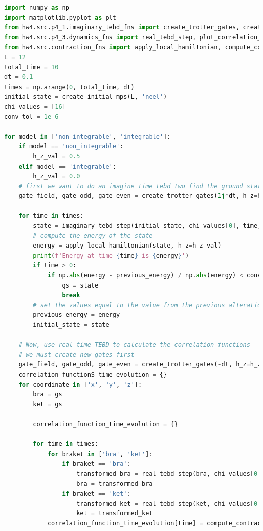 \documentclass[12pt]{article}
\begin{document}
\begin{lstlisting}[language=Python]
import numpy as np
import matplotlib.pyplot as plt
from hw4.src.p4_1.imaginary_tebd_fns import create_trotter_gates, create_initial_mps, imaginary_tebd_step
from hw4.src.p4_3.dynamics_fns import real_tebd_step, plot_correlation_functions
from hw4.src.contraction_fns import apply_local_hamiltonian, compute_contraction
L = 12
total_time = 10
dt = 0.1
times = np.arange(0, total_time, dt)
initial_state = create_initial_mps(L, 'neel')
chi_values = [16]
conv_tol = 1e-6

for model in ['non_integrable', 'integrable']:
    if model == 'non_integrable':
        h_z_val = 0.5
    elif model == 'integrable':
        h_z_val = 0.0
    # first we want to do an imagine time tebd two find the ground state
    gate_field, gate_odd, gate_even = create_trotter_gates(1j*dt, h_z=h_z_val)
    
    for time in times:
        state = imaginary_tebd_step(initial_state, chi_values[0], time, [gate_field, gate_odd, gate_even])
        # compute the energy of the state
        energy = apply_local_hamiltonian(state, h_z=h_z_val)
        print(f'Energy at time {time} is {energy}')
        if time > 0:
            if np.abs(energy - previous_energy) / np.abs(energy) < conv_tol:
                gs = state
                break
        # set the values equal to the value from the previous alteration
        previous_energy = energy
        initial_state = state    
    
    # Now, use real-time TEBD to calculate the correlation functions
    # we must create new gates first
    gate_field, gate_odd, gate_even = create_trotter_gates(-dt, h_z=h_z_val)
    correlation_functionS_time_evolution = {}
    for coordinate in ['x', 'y', 'z']:
        bra = gs
        ket = gs

        correlation_function_time_evolution = {}

        for time in times:
            for braket in ['bra', 'ket']:
                if braket == 'bra':
                    transformed_bra = real_tebd_step(bra, chi_values[0], time, braket, [gate_field, gate_odd, gate_even], coordinate)
                    bra = transformed_bra
                if braket == 'ket':
                    transformed_ket = real_tebd_step(ket, chi_values[0], time, braket, [gate_field, gate_odd, gate_even], coordinate)
                    ket = transformed_ket
            correlation_function_time_evolution[time] = compute_contraction(transformed_bra, transformed_ket)



\end{lstlisting}
\end{document}
